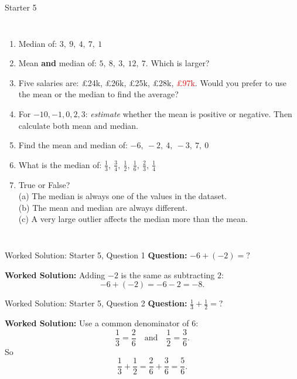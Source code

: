 \documentclass{beamer}
\newcommand{\ashow}[1]{\uncover<2->{\textcolor{red}{\small #1}}}
\newcommand{\ashowq}[1]{\alt<2->{\textcolor{red}{\small #1}}{?}}
\begin{document}
\begin{frame}{Starter 5}
\begin{columns}[T]
\footnotesize
\vspace{0.3em}
\begin{enumerate}\itemsep1pt
  \vspace{-1em}
  \item Median of: $3,\ 9,\ 4,\ 7,\ 1$ \ashow{4}
  \item Mean \textbf{and} median of: $5,\ 8,\ 3,\ 12,\ 7$. Which is larger? \ashow{equal (both $7$)}
  \item Five salaries are: £24k, £26k, £25k, £28k, \textcolor{red}{£97k}. Would you prefer to use the mean or the median to find the average? \ashow{the median}
  \item For $-10,-1,0,2,3$: \textit{estimate} whether the mean is positive or negative. Then calculate both mean and median. \ashow{negative: mean $-1.2$; median $0$}
  \item Find the mean and median of: $-6,\ -2,\ 4,\ -3,\ 7,\ 0$ \ashow{mean $0$; median $-1$}
  \item What is the median of: $\frac{1}{3},\ \frac{3}{4},\ \frac{1}{2},\ \frac{1}{6},\ \frac{2}{3},\ \frac{1}{4}$ \ashow{$\frac{5}{12}$}
  \item True or False?\\
    (a) The median is always one of the values in the dataset. \ashow{False}\\
    (b) The mean and median are always different. \ashow{False}\\
    (c) A very large outlier affects the median more than the mean. \ashow{False}

\end{enumerate}

\end{columns}
\end{frame}

\begin{frame}{Worked Solution: Starter 5, Question 1}
\hypertarget{work-st5}{}
\textbf{Question:} \(-6 + (-2) = ?\)

\textbf{Worked Solution:}
Adding \(-2\) is the same as subtracting \(2\):
\[
-6 + (-2) = -6 - 2 = -8.
\]
\end{frame}

\begin{frame}{Worked Solution: Starter 5, Question 2}
\textbf{Question:} \(\frac{1}{3} + \frac{1}{2} = ?\)

\textbf{Worked Solution:}
Use a common denominator of \(6\):
\[
\frac{1}{3} = \frac{2}{6}
\quad\text{and}\quad
\frac{1}{2} = \frac{3}{6}.
\]
So
\[
\frac{1}{3} + \frac{1}{2}
= \frac{2}{6} + \frac{3}{6}
= \frac{5}{6}.
\]
\end{frame}
\end{document}
